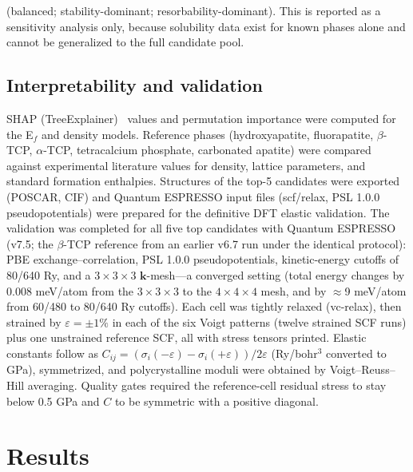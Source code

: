 \documentclass[11pt,a4paper]{article}
\begin{document}
(balanced; stability-dominant; resorbability-dominant). This is reported as a sensitivity analysis only, because solubility data exist for known phases alone and cannot be generalized to the full candidate pool.

\subsection{Interpretability and validation}
SHAP (TreeExplainer)~\cite{lundberg2017} values and permutation importance were computed for the E$_f$ and density models. Reference phases (hydroxyapatite, fluorapatite, $\beta$-TCP, $\alpha$-TCP, tetracalcium phosphate, carbonated apatite) were compared against experimental literature values for density, lattice parameters, and standard formation enthalpies. Structures of the top-5 candidates were exported (POSCAR, CIF) and Quantum ESPRESSO input files (scf/relax, PSL 1.0.0 pseudopotentials) were prepared for the definitive DFT elastic validation. The validation was completed for all five top candidates with Quantum ESPRESSO~\cite{giannozzi2009} (v7.5; the $\beta$-TCP reference from an earlier v6.7 run under the identical protocol): PBE exchange--correlation, PSL 1.0.0 pseudopotentials, kinetic-energy cutoffs of 80/640 Ry, and a $3\times3\times3$ $\mathbf{k}$-mesh---a converged setting (total energy changes by 0.008 meV/atom from the $3\times3\times3$ to the $4\times4\times4$ mesh, and by $\approx$9 meV/atom from 60/480 to 80/640 Ry cutoffs). Each cell was tightly relaxed (vc-relax), then strained by $\varepsilon=\pm1\%$ in each of the six Voigt patterns (twelve strained SCF runs) plus one unstrained reference SCF, all with stress tensors printed. Elastic constants follow as $C_{ij}=(\sigma_i(-\varepsilon)-\sigma_i(+\varepsilon))/2\varepsilon$ (Ry/bohr$^3$ converted to GPa), symmetrized, and polycrystalline moduli were obtained by Voigt--Reuss--Hill averaging. Quality gates required the reference-cell residual stress to stay below 0.5 GPa and $C$ to be symmetric with a positive diagonal.

\section{Results}
\end{document}
